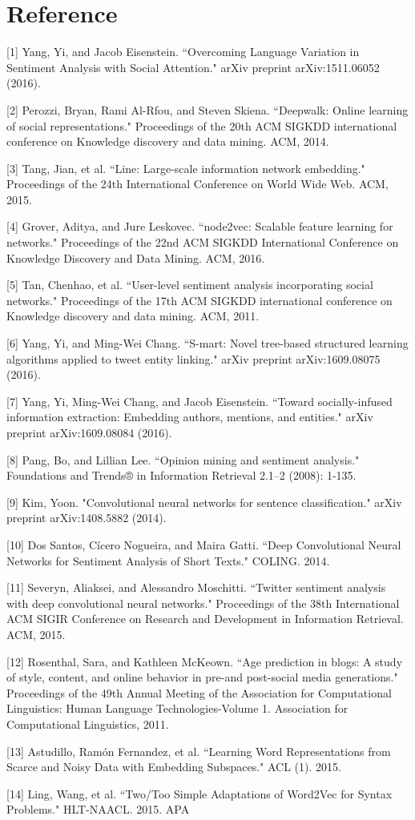 
\section*{Reference}
\small

[1] Yang, Yi, and Jacob Eisenstein. ``Overcoming Language Variation in Sentiment Analysis with Social Attention." arXiv preprint  arXiv:1511.06052 (2016).

[2] Perozzi, Bryan, Rami Al-Rfou, and Steven Skiena. ``Deepwalk: Online learning of social representations." Proceedings of the 20th ACM SIGKDD international conference on Knowledge discovery and data mining. ACM, 2014.

[3] Tang, Jian, et al. ``Line: Large-scale information network embedding." Proceedings of the 24th International Conference on World Wide Web. ACM, 2015.

[4] Grover, Aditya, and Jure Leskovec. ``node2vec: Scalable feature learning for networks." Proceedings of the 22nd ACM SIGKDD International Conference on Knowledge Discovery and Data Mining. ACM, 2016.

[5] Tan, Chenhao, et al. ``User-level sentiment analysis incorporating social networks." Proceedings of the 17th ACM SIGKDD international conference on Knowledge discovery and data mining. ACM, 2011.

[6] Yang, Yi, and Ming-Wei Chang. ``S-mart: Novel tree-based structured learning algorithms applied to tweet entity linking." arXiv preprint arXiv:1609.08075 (2016).

[7] Yang, Yi, Ming-Wei Chang, and Jacob Eisenstein. ``Toward socially-infused information extraction: Embedding authors, mentions, and entities." arXiv preprint arXiv:1609.08084 (2016).

[8] Pang, Bo, and Lillian Lee. ``Opinion mining and sentiment analysis." Foundations and Trends® in Information Retrieval 2.1–2 (2008): 1-135.

[9] Kim, Yoon. "Convolutional neural networks for sentence classification." arXiv preprint arXiv:1408.5882 (2014).

[10] Dos Santos, Cícero Nogueira, and Maira Gatti. ``Deep Convolutional Neural Networks for Sentiment Analysis of Short Texts." COLING. 2014.

[11] Severyn, Aliaksei, and Alessandro Moschitti. ``Twitter sentiment analysis with deep convolutional neural networks." Proceedings of the 38th International ACM SIGIR Conference on Research and Development in Information Retrieval. ACM, 2015.

[12] Rosenthal, Sara, and Kathleen McKeown. ``Age prediction in blogs: A study of style, content, and online behavior in pre-and post-social media generations." Proceedings of the 49th Annual Meeting of the Association for Computational Linguistics: Human Language Technologies-Volume 1. Association for Computational Linguistics, 2011.

[13] Astudillo, Ramón Fernandez, et al. ``Learning Word Representations from Scarce and Noisy Data with Embedding Subspaces." ACL (1). 2015.

[14] Ling, Wang, et al. ``Two/Too Simple Adaptations of Word2Vec for Syntax Problems." HLT-NAACL. 2015.
APA	
